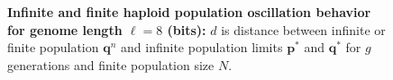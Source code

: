 \begin{figure}[H]
\begin{center}
{}\hspace{5pt}
\hspace{5pt}

\caption{\textbf{Infinite and finite haploid population oscillation behavior for genome length $\ell = 8$ (bits):} $d$ is
  distance between infinite or finite population ${\bm q}^n$ and infinite
  population limits ${{\bm p}^\ast}$ and ${{\bm q}^{\ast}}$ for $g$ generations and finite population size $N$.}
\label{oscillation_8h}
\end{center}
\end{figure}


